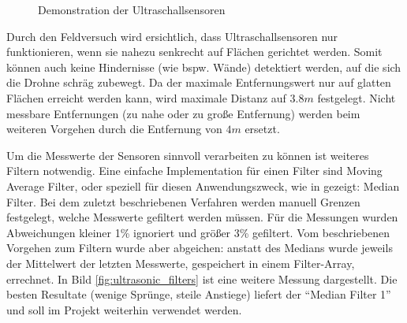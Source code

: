 \begin{figure}[h!]
    \centering

    \caption{Demonstration der Ultraschallsensoren}
    \label{fig:ultrasonic_tests}
\end{figure}

Durch den Feldversuch wird ersichtlich, dass Ultraschallsensoren nur funktionieren, wenn sie nahezu senkrecht auf Flächen gerichtet werden. Somit können auch keine Hindernisse (wie bspw. Wände) detektiert werden, auf die sich die Drohne schräg zubewegt. Da der maximale Entfernungswert nur auf glatten Flächen erreicht werden kann, wird maximale Distanz auf $3.8m$ festgelegt. Nicht messbare Entfernungen (zu nahe oder zu große Entfernung) werden beim weiteren Vorgehen durch die Entfernung von $4m$ ersetzt.

Um die Messwerte der Sensoren sinnvoll verarbeiten zu können ist weiteres Filtern notwendig. Eine einfache Implementation für einen Filter sind Moving Average Filter, oder speziell für diesen Anwendungszweck, wie in \cite{superrenegadeFilteringSensorData2018} gezeigt: Median Filter. Bei dem zuletzt beschriebenen Verfahren werden manuell Grenzen festgelegt, welche Messwerte gefiltert werden müssen. Für die Messungen wurden Abweichungen kleiner 1\% ignoriert und größer 3\% gefiltert. Vom beschriebenen Vorgehen zum Filtern wurde aber abgeichen: anstatt des Medians wurde jeweils der Mittelwert der letzten Messwerte, gespeichert in einem Filter-Array, errechnet. In Bild \ref{fig:ultrasonic_filters} ist eine weitere Messung dargestellt. Die besten Resultate (wenige Sprünge, steile Anstiege) liefert der \enquote{Median Filter 1} und soll im Projekt weiterhin verwendet werden.

